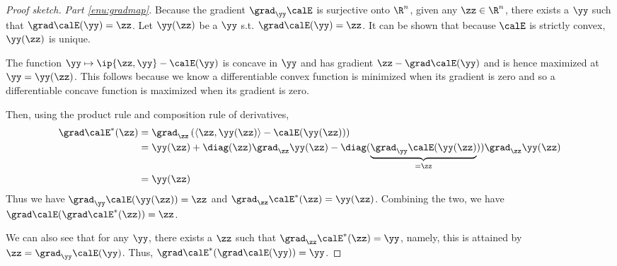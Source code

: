 \begin{proof}[Proof sketch]
  \emph{Part \ref{enu:gradmap}.}
  Because the gradient $\grad_{\yy}\calE$ is surjective onto $\R^n$,
  given any $\zz \in \R^n$, there exists a $\yy$ such that $\grad
  \calE(\yy) = \zz$.  Let $\yy(\zz)$ be a $\yy$ s.t. $\grad
  \calE(\yy) = \zz$.
  It can be shown that because $\calE$ is strictly convex, $\yy(\zz)$
  is unique.
  
  The function $\yy \mapsto \ip{\zz, \yy} - \calE(\yy) $ is concave in
  $\yy$ and has gradient $\zz - \grad \calE(\yy)$ and is hence
  maximized at $\yy = \yy(\zz)$. This follows because we know a
  differentiable convex function is  minimized when its gradient is zero and so a differentiable concave function is
  maximized when its gradient is zero.
  
 Then, using the product rule and composition rule of derivatives,
  \begin{align*}
    \grad\calE^*(\zz) &= \grad_{\zz} \left(\langle\zz,\yy(\zz)\rangle - \calE(\yy(\zz))\right) \\
    &= \yy(\zz) + \diag(\zz)\grad_{\zz}\yy(\zz) - \diag(\underbrace{\grad_{\yy}\calE(\yy(\zz)}_{=\zz}))\grad_{\zz}\yy(\zz) \\
    &= \yy(\zz)
  \end{align*}
  Thus we have $\grad_{\yy}\calE(\yy(\zz)) = \zz$ and
  $\grad_{\zz}\calE^*(\zz)=\yy(\zz)$.
  Combining the two, we have $\grad\calE(\grad\calE^*(\zz))=\zz$.


We can also see that for any $\yy$, there exists a $\zz$ such that
$\grad_{\zz}\calE^*(\zz)=\yy$, namely, this is attained by $\zz =
\grad_{\yy}\calE(\yy)$.
Thus, $\grad\calE^*(\grad\calE(\yy))=\yy$.









\end{proof}

